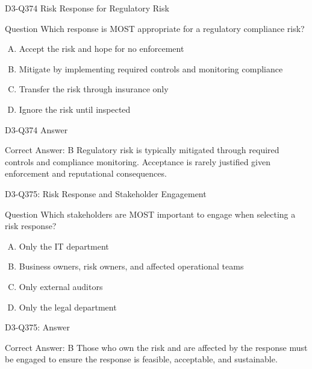 \documentclass{beamer}
\begin{document}
\begin{frame}{D3-Q374 Risk Response for Regulatory Risk}
	\begin{block}{Question}
		Which response is MOST appropriate for a regulatory compliance risk?
	\end{block}
	\begin{enumerate}[(A)]
		\item Accept the risk and hope for no enforcement
		\item Mitigate by implementing required controls and monitoring compliance
		\item Transfer the risk through insurance only
		\item Ignore the risk until inspected
	\end{enumerate}
\end{frame}
\begin{frame}{D3-Q374 Answer}
	\begin{block}{Correct Answer: B}
		Regulatory risk is typically mitigated through required controls and compliance monitoring. Acceptance is rarely justified given enforcement and reputational consequences.
	\end{block}
\end{frame}

\begin{frame}{D3-Q375: Risk Response and Stakeholder Engagement}
	\begin{block}{Question}
		Which stakeholders are MOST important to engage when selecting a risk response?
	\end{block}
	\begin{enumerate}[(A)]
		\item Only the IT department
		\item Business owners, risk owners, and affected operational teams
		\item Only external auditors
		\item Only the legal department
	\end{enumerate}
\end{frame}
\begin{frame}{D3-Q375: Answer}
	\begin{block}{Correct Answer: B}
		Those who own the risk and are affected by the response must be engaged to ensure the response is feasible, acceptable, and sustainable.
	\end{block}
\end{frame}
\end{document}

